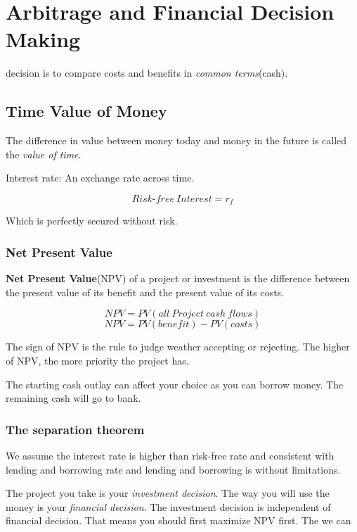 \documentclass[10pt, a4paper]{article}
\begin{document}
    \section{Arbitrage and Financial Decision Making}
        decision is to compare costs and benefits in \emph{common terms}(cash).
        \subsection{Time Value of Money}
            The difference in value between money today and money in the future is called the \emph{value of time}.

            Interest rate: An exchange rate across time. 
            
            $$Risk\text{-}free\ Interest = r_f$$

            Which is perfectly secured without risk.  
            
            \subsubsection{Net Present Value}
                \textbf{Net Present Value}(NPV) of a project or investment is the difference between the present value of its benefit and the present value of its costs. 

                $$NPV = PV (all\ Project\ cash\ flows)$$
                $$NPV = PV(benefit) - PV(costs)$$
            
                The sign of NPV is the rule to judge weather accepting or rejecting. The higher of NPV, the more priority the project has. 

                The starting cash outlay can affect your choice as you can borrow money. The remaining cash will go  to bank. 
            
            \subsubsection{The separation theorem }
                We assume the interest rate is higher than risk-free rate and consistent with lending and borrowing rate and lending and borrowing is without limitations. 

                The project you take is your \emph{investment decision}. The way you will use the money is your \emph{financial decision}. The investment decision is independent of financial decision. That means you should first maximize NPV first. The we can 
\end{document}
